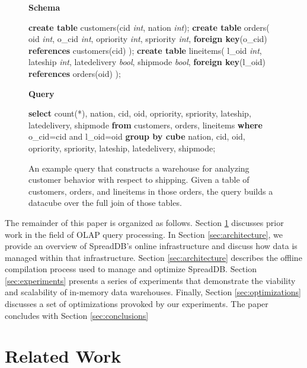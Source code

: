 \begin{figure}
\begin{center}
\textbf{Schema}
\end{center}
\begin{algorithmic}
\STATE \textbf{create table} customers(cid \textit{int}, nation \textit{int}); 
\STATE \textbf{create table} orders(
\STATE \hspace*{0.1in} oid \textit{int}, o\_cid \textit{int}, opriority \textit{int}, spriority \textit{int},
\STATE \hspace*{0.1in}  \textbf{foreign key}(o\_cid) \textbf{references} customers(cid)
\STATE );
\STATE \textbf{create table} lineitems(
\STATE \hspace*{0.1in} l\_oid \textit{int}, lateship \textit{int}, latedelivery \textit{bool}, shipmode \textit{bool},
\STATE \hspace*{0.1in} \textbf{foreign key}(l\_oid) \textbf{references} orders(oid)
\STATE );
\end{algorithmic}
\begin{center}
\textbf{Query}
\end{center}
\begin{algorithmic}
\STATE \textbf{select} count(*),
\STATE \hspace*{0.1in} nation, cid, oid, opriority, spriority, 
\STATE \hspace*{0.1in} lateship, latedelivery, shipmode 
\STATE \textbf{from} customers, orders, lineitems 
\STATE \textbf{where} o\_cid=cid and l\_oid=oid 
\STATE \textbf{group by cube} 
\STATE \hspace*{0.1in} nation, cid, oid, opriority, spriority, 
\STATE \hspace*{0.1in} lateship, latedelivery, shipmode;
\end{algorithmic}
\caption{An example query that constructs a warehouse for analyzing customer behavior with respect to shipping.  Given a table of customers, orders, and lineitems in those orders, the query builds a datacube over the full join of those tables.}
\label{fig:example}  
\end{figure}

The remainder of this paper is organized as follows.  Section \ref{sec:relatedwork} discusses prior work in the field of OLAP query processing.  In Section \ref{sec:architecture}, we provide an overview of SpreadDB's online infrastructure and discuss how data is managed within that infrastructure.  Section \ref{sec:architecture} describes the offline compilation process used to manage and optimize SpreadDB.  Section \ref{sec:experiments} presents a series of experiments that demonstrate the viability and scalability of in-memory data warehouses.  Finally, Section \ref{sec:optimizations} discusses a set of optimizations provoked by our experiments.  The paper concludes with Section \ref{sec:conclusions}

\section{Related Work}
\label{sec:relatedwork}

